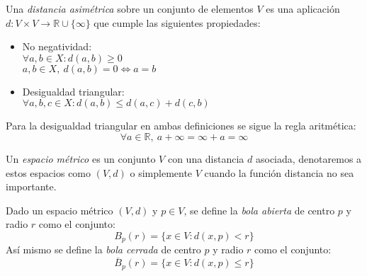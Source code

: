 \begin{definicion}
	Una \textit{distancia asimétrica} sobre un conjunto de elementos $V$ es una aplicación $d:V\times V\rightarrow \mathbb{R}\cup \{\infty\}$ que cumple las siguientes propiedades:
	\begin{itemize}
		\item No negatividad:
		\\ \hspace*{1cm}$\forall a,b\in X:d(a,b) \geq 0$
		\\ \hspace*{1cm}$a,b \in X,\ d(a,b)=0\Leftrightarrow a=b$
		\item Desigualdad triangular:
		\\ \hspace*{1cm}$\forall a,b,c \in X: d(a,b)\leq d(a,c)+d(c,b)$
	\end{itemize}
\end{definicion}

Para la desigualdad triangular en ambas definiciones se sigue la regla aritmética:
$$\forall a\in \mathbb{R},\ a+\infty=\infty+a=\infty$$

\begin{definicion}
	Un \textit{espacio métrico} es un conjunto $V$ con una distancia $d$ asociada, denotaremos a estos espacios como $(V,d)$ o simplemente $V$ cuando la función distancia no sea importante.
\end{definicion}

\begin{definicion}
	Dado un espacio métrico $(V,d)$ y $p \in V$, se define la \textit{bola abierta} de centro $p$ y radio $r$ como el conjunto:
	$$B_p(r) = \{x \in V : d(x,p) < r\}$$
	Así mismo se define la \textit{bola cerrada} de centro $p$ y radio $r$ como el conjunto:
	$$\overline B_p(r) = \{x \in V : d(x,p) \leq r\}$$
\end{definicion}




